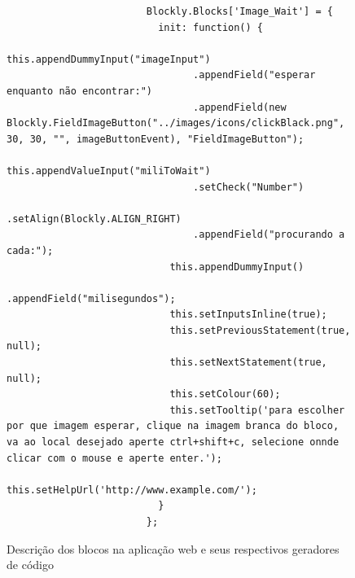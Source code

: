 \documentclass[tg]{mdtufsm}
\begin{document}
\begin{figure}[!htb]
\begin{lstlisting}
                        Blockly.Blocks['Image_Wait'] = {
                          init: function() {
                            this.appendDummyInput("imageInput")
                                .appendField("esperar enquanto não encontrar:")
                                .appendField(new Blockly.FieldImageButton("../images/icons/clickBlack.png", 30, 30, "", imageButtonEvent), "FieldImageButton");
                            this.appendValueInput("miliToWait")
                                .setCheck("Number")
                                .setAlign(Blockly.ALIGN_RIGHT)
                                .appendField("procurando a cada:");
                            this.appendDummyInput()
                                .appendField("milisegundos");
                            this.setInputsInline(true);
                            this.setPreviousStatement(true, null);
                            this.setNextStatement(true, null);
                            this.setColour(60);
                            this.setTooltip('para escolher por que imagem esperar, clique na imagem branca do bloco, va ao local desejado aperte ctrl+shift+c, selecione onnde clicar com o mouse e aperte enter.');
                            this.setHelpUrl('http://www.example.com/');
                          }
                        };
                    \end{lstlisting}
                        \caption{Descrição dos blocos na aplicação web e seus respectivos geradores de código}
                        \label{code:myBlocks.js}
                    \end{figure}
\end{document}
